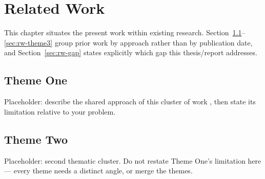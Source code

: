 \chapter{Related Work}\label{ch:related_work}
    

    This chapter situates the present work within existing research.
    Section~\ref{sec:rw-theme1}--\ref{sec:rw-theme3} group prior work by
    approach rather than by publication date, and Section~\ref{sec:rw-gap}
    states explicitly which gap this thesis/report addresses.
    
    \section{Theme One}
    \label{sec:rw-theme1}
    
        
        Placeholder: describe the shared approach of this cluster of work
        \cite{example2024}, then state its limitation relative to your problem.
    
    \section{Theme Two}\label{sec:rw-theme2}
    
        Placeholder: second thematic cluster. Do not restate Theme One's
        limitation here — every theme needs a distinct angle, or merge the
        themes.
    
